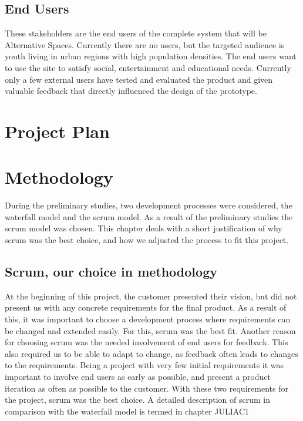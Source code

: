 \subsection{End Users}
\label{subsec:IntroStakeEndUsers}
These stakeholders are the end users of the complete system that will be Alternative Spaces. Currently there are no users, but the targeted audience is youth living in urban regions with high population densities. The end users want to use the site to satisfy social, entertainment and educational needs. Currently only a few external users have tested and evaluated the product and given valuable feedback that directly influenced the design of the prototype.

\section{Project Plan}
\label{sec:IntroProjPlan}

\section{Methodology}
\label{sec:IntroMethod}
During the preliminary studies, two development processes were considered, the waterfall model and the scrum model. As a result of the preliminary studies the scrum model was chosen. This chapter deals with a short justification of why scrum was the best choice, and how we adjusted the process to fit this project.

\subsection*{Scrum, our choice in methodology}
\label{subsec:IntroMethodChoice}
At the beginning of this project, the customer presented their vision, but did not present us with any concrete requirements for the final product. As a result of this, it was important to choose a development process where requirements can be changed and extended easily. For this, scrum was the best fit. Another reason for choosing scrum was the needed involvement of end users for feedback. This also required us to be able to adapt to change, as feedback often leads to changes to the requirements. Being a project with very few initial requirements it was important to involve end users as early as possible, and present a  product iteration as often as possible to the customer. With these two requirements for the project, scrum was the best choice. A detailed description of scrum in comparison with the waterfall model is termed in chapter JULIAC1 %


